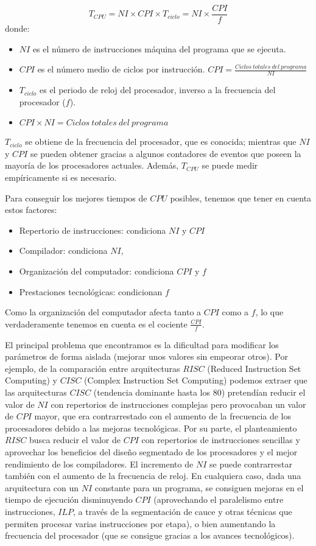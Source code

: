 \documentclass[a4paper, 11pt]{article}
\begin{document}
$$T_{CPU} = NI\times CPI \times T_{ciclo}=NI \times \frac{CPI}{f}$$ donde: 
\begin{itemize}
	\item $NI$ es el número de instrucciones máquina del programa que se ejecuta. 
	\item $CPI$ es el número medio de ciclos por instrucción. $CPI = \frac{Ciclos\ totales\ del\ programa}{NI}$
	\item $T_{ciclo}$ es el periodo de reloj del procesador, inverso a la frecuencia del procesador ($f$). 
	\item $CPI \times NI = Ciclos\ totales\ del\ programa$
\end{itemize}

$T_{ciclo}$ se obtiene de la frecuencia del procesador, que es conocida; mientras que $NI$ y $CPI$ se pueden obtener gracias a algunos contadores de eventos que poseen la mayoría de los procesadores actuales. Además, $T_{CPU}$ se puede medir empíricamente si es necesario. 

Para conseguir los mejores tiempos de $CPU$ posibles, tenemos que tener en cuenta estos factores:

\begin{itemize}
	\item Repertorio de instrucciones: condiciona $NI$ y $CPI$
	\item Compilador: condiciona $NI$, 
	\item Organización del computador: condiciona $CPI$ y $f$
	\item Prestaciones tecnológicas: condicionan $f$
\end{itemize}

Como la organización del computador afecta tanto a $CPI$ como a $f$, lo que verdaderamente tenemos en cuenta es el cociente $\frac{CPI}{f}$. 

El principal problema que encontramos es la dificultad para modificar los parámetros de forma aislada (mejorar unos valores sin empeorar otros). Por ejemplo, de la comparación entre arquitecturas $RISC$ (Reduced Instruction Set Computing) y $CISC$ (Complex Instruction Set Computing) podemos extraer que las arquitecturas $CISC$ (tendencia dominante hasta los 80) pretendían reducir el valor de $NI$ con repertorios de instrucciones complejas pero provocaban un valor de $CPI$ mayor, que era contrarrestado con el aumento de la frecuencia de los procesadores debido a las mejoras tecnológicas. Por su parte, el planteamiento $RISC$ busca reducir el valor de $CPI$ con repertorios de instrucciones sencillas y aprovechar los beneficios del diseño segmentado de los procesadores y el mejor rendimiento de los compiladores. El incremento de $NI$ se puede contrarrestar también con el aumento de la frecuencia de reloj. En cualquiera caso, dada una arquitectura con un $NI$ constante para un programa, se consiguen mejoras en el tiempo de ejecución disminuyendo $CPI$ (aprovechando el paralelismo entre instrucciones, $ILP$, a través de la segmentación de cauce y otras técnicas que permiten procesar varias instrucciones por etapa), o bien aumentando la frecuencia del procesador (que se consigue gracias a los avances tecnológicos). 
\end{document}
